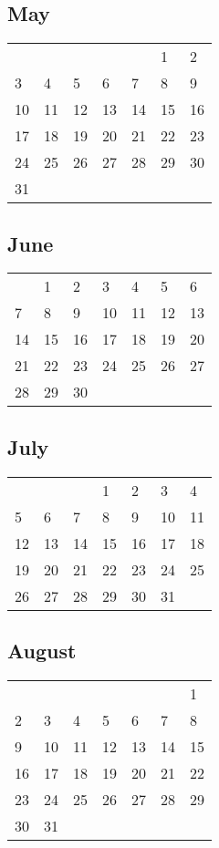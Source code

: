 \hypertarget{may}{%
\subsection{May}\label{may}}

\begin{longtable}[]{@{}lllllll@{}}
\toprule
\endhead
& & & & & 1 & 2\tabularnewline
3 & 4 & 5 & 6 & 7 & 8 & 9\tabularnewline
10 & 11 & 12 & 13 & 14 & 15 & 16\tabularnewline
17 & 18 & 19 & 20 & 21 & 22 & 23\tabularnewline
24 & 25 & 26 & 27 & 28 & 29 & 30\tabularnewline
31 & & & & & &\tabularnewline
\bottomrule
\end{longtable}

\hypertarget{june}{%
\subsection{June}\label{june}}

\begin{longtable}[]{@{}lllllll@{}}
\toprule
\endhead
& 1 & 2 & 3 & 4 & 5 & 6\tabularnewline
7 & 8 & 9 & 10 & 11 & 12 & 13\tabularnewline
14 & 15 & 16 & 17 & 18 & 19 & 20\tabularnewline
21 & 22 & 23 & 24 & 25 & 26 & 27\tabularnewline
28 & 29 & 30 & & & &\tabularnewline
\bottomrule
\end{longtable}

\hypertarget{july}{%
\subsection{July}\label{july}}

\begin{longtable}[]{@{}lllllll@{}}
\toprule
\endhead
& & & 1 & 2 & 3 & 4\tabularnewline
5 & 6 & 7 & 8 & 9 & 10 & 11\tabularnewline
12 & 13 & 14 & 15 & 16 & 17 & 18\tabularnewline
19 & 20 & 21 & 22 & 23 & 24 & 25\tabularnewline
26 & 27 & 28 & 29 & 30 & 31 &\tabularnewline
\bottomrule
\end{longtable}

\hypertarget{august}{%
\subsection{August}\label{august}}

\begin{longtable}[]{@{}lllllll@{}}
\toprule
\endhead
& & & & & & 1\tabularnewline
2 & 3 & 4 & 5 & 6 & 7 & 8\tabularnewline
9 & 10 & 11 & 12 & 13 & 14 & 15\tabularnewline
16 & 17 & 18 & 19 & 20 & 21 & 22\tabularnewline
23 & 24 & 25 & 26 & 27 & 28 & 29\tabularnewline
30 & 31 & & & & &\tabularnewline
\bottomrule
\end{longtable}

